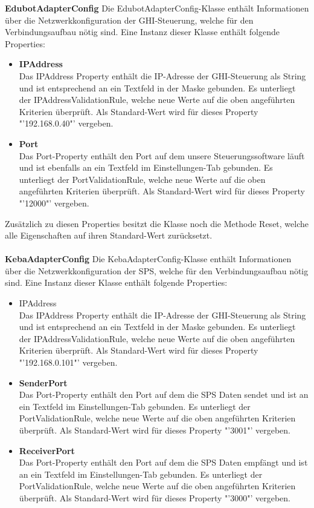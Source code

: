 \textbf{EdubotAdapterConfig}
Die EdubotAdapterConfig-Klasse enthält Informationen über die Netzwerkkonfiguration der GHI-Steuerung, welche für den Verbindungsaufbau nötig sind.
Eine Instanz dieser Klasse enthält folgende Properties:
\begin{itemize}
\item \textbf{IPAddress}\\
Das IPAddress Property enthält die IP-Adresse der GHI-Steuerung als String und ist entsprechend an ein Textfeld in der Maske gebunden. Es unterliegt der IPAddressValidationRule, welche neue Werte auf die oben angeführten Kriterien überprüft. Als Standard-Wert wird für dieses Property "'192.168.0.40"' vergeben.
\item \textbf{Port}\\
Das Port-Property enthält den Port auf dem unsere Steuerungssoftware läuft und ist ebenfalls an ein Textfeld im Einstellungen-Tab gebunden. Es unterliegt der PortValidationRule,  welche neue Werte auf die oben angeführten Kriterien überprüft. Als Standard-Wert wird für dieses Property "'12000"' vergeben.
\end{itemize}
Zusätzlich zu diesen Properties besitzt die Klasse noch die Methode Reset, welche alle Eigenschaften auf ihren Standard-Wert zurücksetzt.\\
\\
\textbf{KebaAdapterConfig}
Die KebaAdapterConfig-Klasse enthält Informationen über die Netzwerkkonfiguration der SPS, welche für den Verbindungsaufbau nötig sind.
Eine Instanz dieser Klasse enthält folgende Properties:
\begin{itemize}
\item IPAddress\\
Das IPAddress Property enthält die IP-Adresse der GHI-Steuerung als String und ist entsprechend an ein Textfeld in der Maske gebunden. Es unterliegt der IPAddressValidationRule, welche neue Werte auf die oben angeführten Kriterien überprüft. Als Standard-Wert wird für dieses Property "'192.168.0.101"' vergeben.
\item \textbf{SenderPort}\\
Das Port-Property enthält den Port auf dem die SPS Daten sendet und ist an ein Textfeld im Einstellungen-Tab gebunden. Es unterliegt der PortValidationRule,  welche neue Werte auf die oben angeführten Kriterien überprüft. Als Standard-Wert wird für dieses Property "'3001"' vergeben.
\item \textbf{ReceiverPort}\\
Das Port-Property enthält den Port auf dem die SPS Daten empfängt  und ist an ein Textfeld im Einstellungen-Tab gebunden. Es unterliegt der PortValidationRule,  welche neue Werte auf die oben angeführten Kriterien überprüft. Als Standard-Wert wird für dieses Property "'3000"' vergeben.
\end{itemize}
